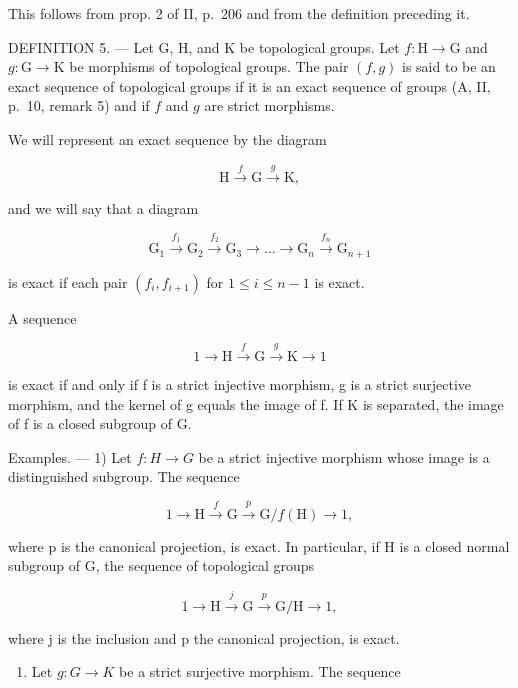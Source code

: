 This follows from prop. 2 of II, p.~206 and from the definition preceding it.

DEFINITION 5. --- Let G, H, and K be topological groups. Let \(f: \mathrm{H} \to \mathrm{G}\) and \(g: \mathrm{G} \to \mathrm{K}\) be morphisms of topological groups. The pair \((f, g)\) is said to be an exact sequence of topological groups if it is an exact sequence of groups (A, II, p.~10, remark 5) and if \(f\) and \(g\) are strict morphisms.

We will represent an exact sequence by the diagram

\[
\mathrm{H} \xrightarrow {f} \mathrm{G} \xrightarrow {g} \mathrm{K},
\]

and we will say that a diagram

\[
\mathrm{G} _ {1} \xrightarrow {f _ {1}} \mathrm{G} _ {2} \xrightarrow {f _ {2}} \mathrm{G} _ {3} \rightarrow \dots \rightarrow \mathrm{G} _ {n} \xrightarrow {f _ {n}} \mathrm{G} _ {n + 1}
\]

is exact if each pair \((f_i, f_{i+1})\) for \(1 \leqslant i \leqslant n-1\) is exact.

A sequence

\[
1 \to \mathrm{H} \xrightarrow {f} \mathrm{G} \xrightarrow {g} \mathrm{K} \to 1
\]

is exact if and only if f is a strict injective morphism, g is a strict surjective morphism, and the kernel of g equals the image of f. If K is separated, the image of f is a closed subgroup of G.

Examples. --- 1) Let \(f\colon H \to G\) be a strict injective morphism whose image is a distinguished subgroup. The sequence

\[
1 \to \mathrm{H} \xrightarrow {f} \mathrm{G} \xrightarrow {p} \mathrm{G} / f (\mathrm{H}) \to 1,
\]

where p is the canonical projection, is exact. In particular, if H is a closed normal subgroup of G, the sequence of topological groups

\[
1 \to \mathrm{H} \xrightarrow {j} \mathrm{G} \xrightarrow {p} \mathrm{G} / \mathrm{H} \to 1,
\]

where j is the inclusion and p the canonical projection, is exact.

\begin{enumerate}
\def\labelenumi{\arabic{enumi})}
\setcounter{enumi}{1}
\tightlist
\item
  Let \(g: G \rightarrow K\) be a strict surjective morphism. The sequence
\end{enumerate}

